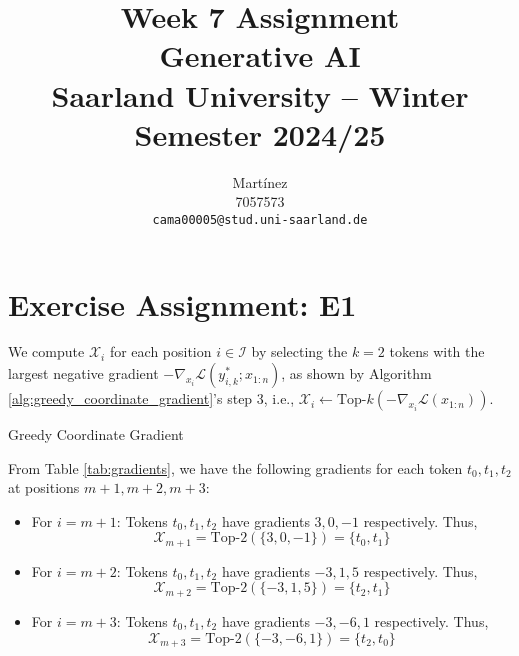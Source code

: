 \documentclass{article}
\title{Week 7 Assignment\\
\vspace{2mm}
\small{Generative AI}
\\
\vspace{2mm}
\small{Saarland University -- Winter Semester 2024/25}
}
\author{%
  Martínez \\
  7057573 \\
  \texttt{cama00005@stud.uni-saarland.de} \\
}
\begin{document}
\DeclareRobustCommand{\textitbf}[1]{\textbf{\textit{#1}}} %

\maketitle

\section{Exercise Assignment: E1}\label{sec:e1}

We compute \(\mathcal{X}_i\) for each position \(i \in \mathcal{I}\) by selecting the \(k = 2\) tokens with the largest negative gradient \(-\nabla_{x_i} \mathcal{L}(y^*_{i,k}; x_{1:n})\), as shown by Algorithm \ref{alg:greedy_coordinate_gradient}'s step 3, i.e., $\mathcal{X}_i \gets \text{Top-}k(-\nabla_{x_i} \mathcal{L}(x_{1:n}))$.

\begin{algorithm}[H]
    \caption{Greedy Coordinate Gradient \cite{zou2023universaltransferableadversarialattacks}}
    \label{alg:greedy_coordinate_gradient}

\end{algorithm}

From Table \ref{tab:gradients}, we have the following gradients for each token \(t_0, t_1, t_2\) at positions \(m+1, m+2, m+3\):
\begin{itemize}
    \item For \(i = m+1\): Tokens \(t_0, t_1, t_2\) have gradients $3, 0, -1$ respectively. Thus,
    \[
        \mathcal{X}_{m+1} = \text{Top-}2(\{3, 0, -1\}) = \{t_0, t_1\}
    \]
    \item For \(i = m+2\): Tokens \(t_0, t_1, t_2\) have gradients $-3, 1, 5$ respectively. Thus,
    \[
        \mathcal{X}_{m+2} = \text{Top-}2(\{-3, 1, 5\}) = \{t_2, t_1\}
    \]
    \item For \(i = m+3\):  Tokens \(t_0, t_1, t_2\) have gradients $-3, -6, 1$ respectively. Thus,
    \[
        \mathcal{X}_{m+3} = \text{Top-}2(\{-3, -6, 1\}) = \{t_2, t_0\}
    \]
\end{itemize}
\end{document}
